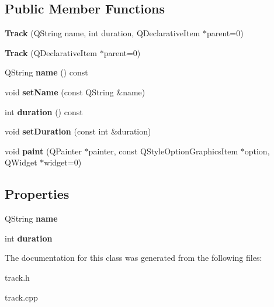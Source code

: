 \subsection*{\-Public \-Member \-Functions}
\begin{DoxyCompactItemize}
\item 
\hypertarget{class_track_af5112d29fa80bc29272af65b6f08c977}{{\bfseries \-Track} (\-Q\-String name, int duration, \-Q\-Declarative\-Item $\ast$parent=0)}\label{class_track_af5112d29fa80bc29272af65b6f08c977}

\item 
\hypertarget{class_track_affa44d128caa9d15e26c16dfbb6ec7b2}{{\bfseries \-Track} (\-Q\-Declarative\-Item $\ast$parent=0)}\label{class_track_affa44d128caa9d15e26c16dfbb6ec7b2}

\item 
\hypertarget{class_track_a9f49d4308db610406640c6b905a599ee}{\-Q\-String {\bfseries name} () const }\label{class_track_a9f49d4308db610406640c6b905a599ee}

\item 
\hypertarget{class_track_a7f403ec64013e861f1c5fcbb7816a1e7}{void {\bfseries set\-Name} (const \-Q\-String \&name)}\label{class_track_a7f403ec64013e861f1c5fcbb7816a1e7}

\item 
\hypertarget{class_track_ae667aba1aeb758a45f3e9620700caa52}{int {\bfseries duration} () const }\label{class_track_ae667aba1aeb758a45f3e9620700caa52}

\item 
\hypertarget{class_track_ac43814b6fb60249f2640d2a96e9607b1}{void {\bfseries set\-Duration} (const int \&duration)}\label{class_track_ac43814b6fb60249f2640d2a96e9607b1}

\item 
\hypertarget{class_track_ab14ea443d2e5f012abb50acb94528063}{void {\bfseries paint} (\-Q\-Painter $\ast$painter, const \-Q\-Style\-Option\-Graphics\-Item $\ast$option, \-Q\-Widget $\ast$widget=0)}\label{class_track_ab14ea443d2e5f012abb50acb94528063}

\end{DoxyCompactItemize}
\subsection*{\-Properties}
\begin{DoxyCompactItemize}
\item 
\hypertarget{class_track_ab2a89648b1887bba5effc459f4a4d357}{\-Q\-String {\bfseries name}}\label{class_track_ab2a89648b1887bba5effc459f4a4d357}

\item 
\hypertarget{class_track_a84b1dd634704ec21c1e3eaab6a01d36b}{int {\bfseries duration}}\label{class_track_a84b1dd634704ec21c1e3eaab6a01d36b}

\end{DoxyCompactItemize}


\-The documentation for this class was generated from the following files\-:\begin{DoxyCompactItemize}
\item 
track.\-h\item 
track.\-cpp\end{DoxyCompactItemize}
